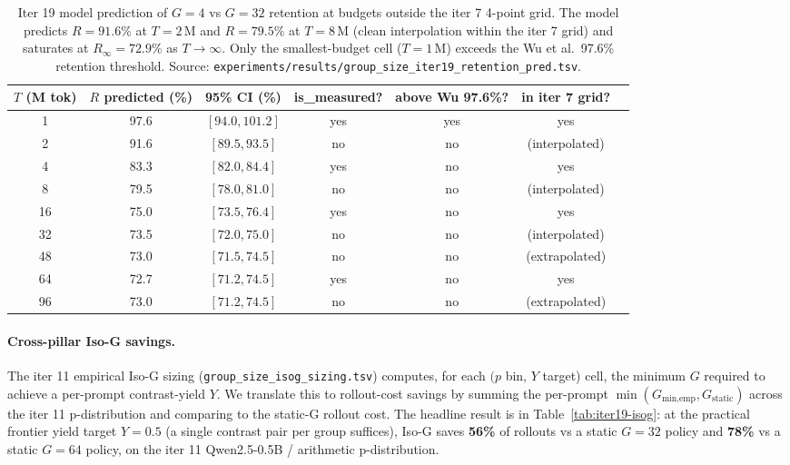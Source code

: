 \begin{table}[htbp]
\centering
\small
\begin{tabular}{ccccccc}
\toprule
$T$ (M tok) & $R$ predicted (\%) & 95\% CI (\%) & is\_measured? & above Wu 97.6\%? & in iter 7 grid? \\
\midrule
1   & 97.6 & $[94.0, 101.2]$  & yes & yes & yes \\
2   & 91.6 & $[89.5, 93.5]$   & no  & no  & (interpolated) \\
4   & 83.3 & $[82.0, 84.4]$   & yes & no  & yes \\
8   & 79.5 & $[78.0, 81.0]$   & no  & no  & (interpolated) \\
16  & 75.0 & $[73.5, 76.4]$   & yes & no  & yes \\
32  & 73.5 & $[72.0, 75.0]$   & no  & no  & (interpolated) \\
48  & 73.0 & $[71.5, 74.5]$   & no  & no  & (extrapolated) \\
64  & 72.7 & $[71.2, 74.5]$   & yes & no  & yes \\
96  & 73.0 & $[71.2, 74.5]$   & no  & no  & (extrapolated) \\
\bottomrule
\end{tabular}
\caption{Iter 19 model prediction of $G{=}4$ vs $G{=}32$ retention
at budgets outside the iter 7 4-point grid.  The model predicts
$R = 91.6\%$ at $T{=}2$\,M and $R = 79.5\%$ at $T{=}8$\,M (clean
interpolation within the iter 7 grid) and saturates at $R_\infty =
72.9\%$ as $T \to \infty$.  Only the smallest-budget cell ($T{=}1$\,M)
exceeds the Wu et al.\ 97.6\% retention threshold.  Source:
\texttt{experiments/results/group\_size\_iter19\_retention\_pred.tsv}.}
\label{tab:iter19-pred}
\end{table}

\paragraph{Cross-pillar Iso-G savings.}
The iter 11 empirical Iso-G sizing
(\texttt{group\_size\_isog\_sizing.tsv}) computes, for each $(p$ bin,
$Y$ target) cell, the minimum $G$ required to achieve a per-prompt
contrast-yield $Y$.  We translate this to rollout-cost savings by
summing the per-prompt $\min(G_\text{min,emp}, G_\text{static})$ across
the iter 11 p-distribution and comparing to the static-G rollout cost.
The headline result is in
Table~\ref{tab:iter19-isog}: at the practical frontier yield target
$Y{=}0.5$ (a single contrast pair per group suffices), Iso-G saves
\textbf{56\%} of rollouts vs a static $G{=}32$ policy and
\textbf{78\%} vs a static $G{=}64$ policy, on the iter 11
Qwen2.5-0.5B / arithmetic p-distribution.

